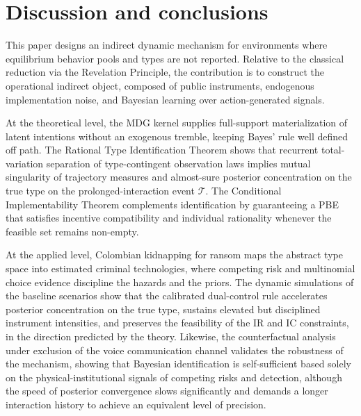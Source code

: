 \documentclass[pdflatex,sn-mathphys-ay]{sn-jnl}
\theoremstyle{plain}
\theoremstyle{definition}
\newcommand{\1}{\mathbf{1}}
\begin{document}
\section{Discussion and conclusions}\label{sec:conclusiones}

This paper designs an indirect dynamic mechanism for environments where equilibrium behavior pools and types are not reported. Relative to the classical reduction via the Revelation Principle, the contribution is to construct the operational indirect object, composed of public instruments, endogenous implementation noise, and Bayesian learning over action-generated signals.

At the theoretical level, the MDG kernel supplies full-support materialization of latent intentions without an exogenous tremble, keeping Bayes' rule well defined off path. The Rational Type Identification Theorem shows that recurrent total-variation separation of type-contingent observation laws implies mutual singularity of trajectory measures and almost-sure posterior concentration on the true type on the prolonged-interaction event $\mathcal{T}$. The Conditional Implementability Theorem complements identification by guaranteeing a PBE that satisfies incentive compatibility and individual rationality whenever the feasible set remains non-empty.

At the applied level, Colombian kidnapping for ransom maps the abstract type space into estimated criminal technologies, where competing risk and multinomial choice evidence discipline the hazards and the priors. The dynamic simulations of the baseline scenarios show that the calibrated dual-control rule accelerates posterior concentration on the true type, sustains elevated but disciplined instrument intensities, and preserves the feasibility of the IR and IC constraints, in the direction predicted by the theory. Likewise, the counterfactual analysis under exclusion of the voice communication channel validates the robustness of the mechanism, showing that Bayesian identification is self-sufficient based solely on the physical-institutional signals of competing risks and detection, although the speed of posterior convergence slows significantly and demands a longer interaction history to achieve an equivalent level of precision.
\end{document}
